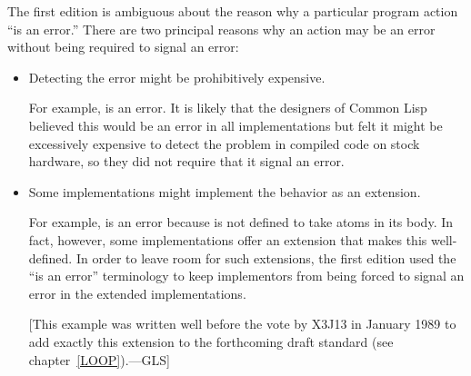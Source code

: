 The first edition is ambiguous about the reason why a particular program action
``is an error.'' There are two principal reasons why an action may be an error
without being required to signal an error:
\begin{itemize}
\item Detecting the error might be prohibitively expensive.

   For example,  is an error. It is likely that the designers of
   Common Lisp believed this would be an error in all implementations but
   felt it might be excessively expensive to detect the problem
   in compiled code on stock hardware, so they did not require that it signal
   an error.

\item Some implementations might implement the behavior as an extension.

   For example,  is an error because 
   is not defined to take atoms in its body.
   In fact, however, some
   implementations offer an extension that makes this well-defined. In order
   to leave room for such extensions, the first edition used the ``is an error''
   terminology to keep implementors from being forced to signal an error in
   the extended implementations.

   [This example was written well before the vote by X3J13 in January 1989
    to add exactly this extension to the forthcoming draft standard
    (see chapter~\ref{LOOP}).---GLS]
\end{itemize}

